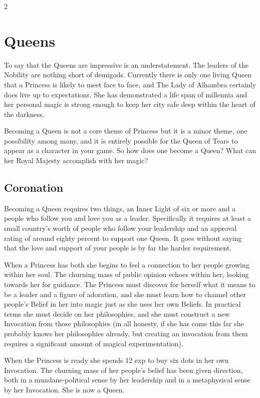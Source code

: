 \begin{multicols}{2}
\section*{Queens}
\label{sec:Queens}

To say that the Queens are impressive is an understatement. The leaders of the Nobility are nothing short of demigods. Currently there is only one living Queen that a Princess is likely to meet face to face, and The Lady of Alhambra certainly does live up to expectations. She has demonstrated a life span of millennia and her personal magic is strong enough to keep her city safe deep within the heart of the darkness. 

Becoming a Queen is not a core theme of Princess but it is a minor theme, one possibility among many, and it is entirely possible for the Queen of Tears to appear as a character in your game. So how does one become a Queen? What can her Royal Majesty accomplish with her magic? 

\subsection*{Coronation}
Becoming a Queen requires two things, an Inner Light of six or more and a people who follow you and love you as a leader. Specifically it requires at least a small country's worth of people who follow your leadership and an approval rating of around eighty percent to support one Queen. It goes without saying that the love and support of your people is by far the harder requirement. 

When a Princess has both she begins to feel a connection to her people growing within her soul. The churning mass of public opinion echoes within her, looking towards her for guidance. The Princess must discover for herself what it means to be a leader and a figure of adoration, and she must learn how to channel other people's Belief in her into magic just as she uses her own Beliefs. In practical terms she must decide on her philosophies, and she must construct a new Invocation from those philosophies (in all honesty, if she has come this far she probably knows her philosophies already, but creating an invocation from them requires a significant amount of magical experimentation). 

When the Princess is ready she spends 12 exp to buy six dots in her own Invocation. The churning mass of her people's belief has been given direction, both in a mundane-political sense by her leadership and in a metaphysical sense by her Invocation. She is now a Queen.


\end{multicols}
